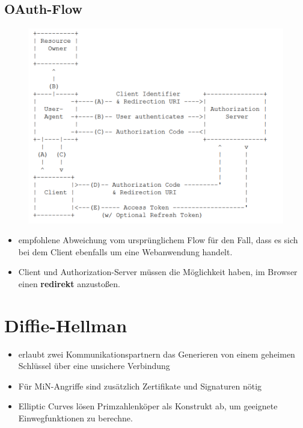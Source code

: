 \subsection{OAuth-Flow}
\begin{figure}[H]
	\begin{center}
		\includegraphics[scale=0.8]{Resources/OAuthFlow}
		\caption{}
		\label{fig:OAuthFlow}
	\end{center}
\end{figure}
\begin{itemize}
	\item empfohlene Abweichung vom ursprünglichem Flow für den Fall, dass es sich bei dem Client ebenfalls um eine Webanwendung handelt.
	\item Client und Authorization-Server müssen die Möglichkeit haben, im Browser einen \textbf{redirekt} anzustoßen.
\end{itemize}

\section{Diffie-Hellman}
\begin{itemize}
	\item erlaubt zwei Kommunikationspartnern das Generieren von einem geheimen Schlüssel über eine unsichere Verbindung
	\item Für MiN-Angriffe sind zusätzlich Zertifikate und Signaturen nötig
	\item Elliptic Curves lösen Primzahlenköper als Konstrukt ab, um geeignete Einwegfunktionen zu berechne.
\end{itemize}


